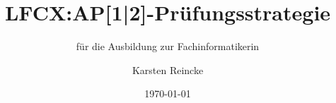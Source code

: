 \documentclass[]{beamer}
\title{LFCX:AP[1|2]-Prüfungsstrategie}
\subtitle{für die Ausbildung zur Fachinformatikerin}
\institute[GS-LDK]{Gewerbliche Schulen Dillenburg}
\author{Karsten Reincke}
\date{\today}
\def\cfgGl{../../../cfg.gl/}
\begin{document}

\begin{frame}
  \titlepage

  
\end{frame}






\logo{}
\newpage

%

%
\end{document}
